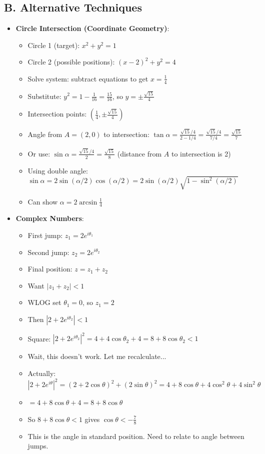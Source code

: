 \documentclass[12pt]{article}
\begin{document}
\begin{techniquesbox}
\subsection*{B. Alternative Techniques}
\begin{itemize}[leftmargin=*]
    \item \textbf{Circle Intersection (Coordinate Geometry)}:
    \begin{itemize}
        \item Circle 1 (target): $x^2 + y^2 = 1$
        \item Circle 2 (possible positions): $(x-2)^2 + y^2 = 4$
        \item Solve system: subtract equations to get $x = \frac{1}{4}$
        \item Substitute: $y^2 = 1 - \frac{1}{16} = \frac{15}{16}$, so $y = \pm\frac{\sqrt{15}}{4}$
        \item Intersection points: $\left(\frac{1}{4}, \pm\frac{\sqrt{15}}{4}\right)$
        \item Angle from $A = (2,0)$ to intersection: $\tan\alpha = \frac{\sqrt{15}/4}{2 - 1/4} = \frac{\sqrt{15}/4}{7/4} = \frac{\sqrt{15}}{7}$
        \item Or use: $\sin\alpha = \frac{\sqrt{15}/4}{2} = \frac{\sqrt{15}}{8}$ (distance from $A$ to intersection is 2)
        \item Using double angle: $\sin\alpha = 2\sin(\alpha/2)\cos(\alpha/2) = 2\sin(\alpha/2)\sqrt{1-\sin^2(\alpha/2)}$
        \item Can show $\alpha = 2\arcsin\frac{1}{4}$
    \end{itemize}
    \item \textbf{Complex Numbers}:
    \begin{itemize}
        \item First jump: $z_1 = 2e^{i\theta_1}$
        \item Second jump: $z_2 = 2e^{i\theta_2}$
        \item Final position: $z = z_1 + z_2$
        \item Want $|z_1 + z_2| < 1$
        \item WLOG set $\theta_1 = 0$, so $z_1 = 2$
        \item Then $|2 + 2e^{i\theta_2}| < 1$
        \item Square: $|2 + 2e^{i\theta_2}|^2 = 4 + 4\cos\theta_2 + 4 = 8 + 8\cos\theta_2 < 1$
        \item Wait, this doesn't work. Let me recalculate...
        \item Actually: $|2 + 2e^{i\theta}|^2 = (2 + 2\cos\theta)^2 + (2\sin\theta)^2 = 4 + 8\cos\theta + 4\cos^2\theta + 4\sin^2\theta$
        \item $= 4 + 8\cos\theta + 4 = 8 + 8\cos\theta$
        \item So $8 + 8\cos\theta < 1$ gives $\cos\theta < -\frac{7}{8}$
        \item This is the angle in standard position. Need to relate to angle between jumps.
    \end{itemize}
\end{itemize}


\end{techniquesbox}
\end{document}
